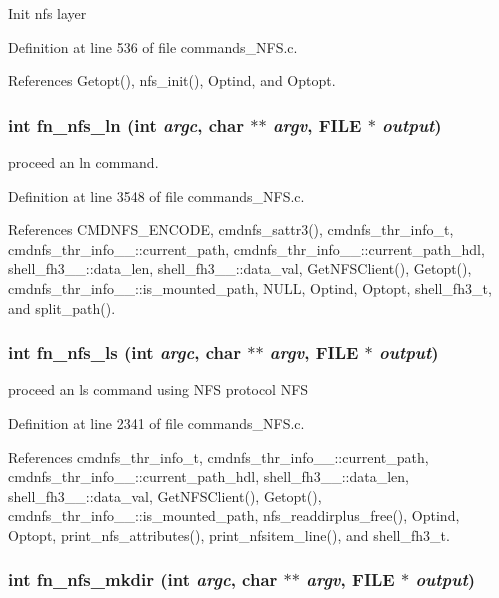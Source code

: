 Init nfs layer 

Definition at line 536 of file commands\_\-NFS.c.

References Getopt(), nfs\_\-init(), Optind, and Optopt.
\subsubsection{\setlength{\rightskip}{0pt plus 5cm}int fn\_\-nfs\_\-ln (int {\em argc}, char $\ast$$\ast$ {\em argv}, FILE $\ast$ {\em output})}\label{commands__NFS_8c_a52}


proceed an ln command. 

Definition at line 3548 of file commands\_\-NFS.c.

References CMDNFS\_\-ENCODE, cmdnfs\_\-sattr3(), cmdnfs\_\-thr\_\-info\_\-t, cmdnfs\_\-thr\_\-info\_\-\_\-::current\_\-path, cmdnfs\_\-thr\_\-info\_\-\_\-::current\_\-path\_\-hdl, shell\_\-fh3\_\-\_\-::data\_\-len, shell\_\-fh3\_\-\_\-::data\_\-val, Get\-NFSClient(), Getopt(), cmdnfs\_\-thr\_\-info\_\-\_\-::is\_\-mounted\_\-path, NULL, Optind, Optopt, shell\_\-fh3\_\-t, and split\_\-path().
\subsubsection{\setlength{\rightskip}{0pt plus 5cm}int fn\_\-nfs\_\-ls (int {\em argc}, char $\ast$$\ast$ {\em argv}, FILE $\ast$ {\em output})}\label{commands__NFS_8c_a44}


proceed an ls command using NFS protocol NFS 

Definition at line 2341 of file commands\_\-NFS.c.

References cmdnfs\_\-thr\_\-info\_\-t, cmdnfs\_\-thr\_\-info\_\-\_\-::current\_\-path, cmdnfs\_\-thr\_\-info\_\-\_\-::current\_\-path\_\-hdl, shell\_\-fh3\_\-\_\-::data\_\-len, shell\_\-fh3\_\-\_\-::data\_\-val, Get\-NFSClient(), Getopt(), cmdnfs\_\-thr\_\-info\_\-\_\-::is\_\-mounted\_\-path, nfs\_\-readdirplus\_\-free(), Optind, Optopt, print\_\-nfs\_\-attributes(), print\_\-nfsitem\_\-line(), and shell\_\-fh3\_\-t.
\subsubsection{\setlength{\rightskip}{0pt plus 5cm}int fn\_\-nfs\_\-mkdir (int {\em argc}, char $\ast$$\ast$ {\em argv}, FILE $\ast$ {\em output})}\label{commands__NFS_8c_a47}


